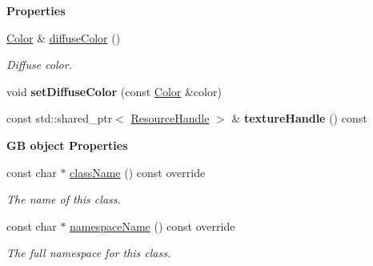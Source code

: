 \begin{Indent}\textbf{ Properties}\par
\begin{DoxyCompactItemize}
\item 
\mbox{\label{classrev_1_1_cube_map_component_a5e8163a9264a412a53f5bf65583bc320}} 
\mbox{\hyperlink{classrev_1_1_color}{Color}} \& \mbox{\hyperlink{classrev_1_1_cube_map_component_a5e8163a9264a412a53f5bf65583bc320}{diffuse\+Color}} ()
\begin{DoxyCompactList}\small\item\em Diffuse color. \end{DoxyCompactList}\item 
\mbox{\label{classrev_1_1_cube_map_component_af259a84d039ac304b7f5ed0de8df1798}} 
void {\bfseries set\+Diffuse\+Color} (const \mbox{\hyperlink{classrev_1_1_color}{Color}} \&color)
\item 
\mbox{\label{classrev_1_1_cube_map_component_a69c45ca899a3cf4497c244f60038bb1c}} 
const std\+::shared\+\_\+ptr$<$ \mbox{\hyperlink{classrev_1_1_resource_handle}{Resource\+Handle}} $>$ \& {\bfseries texture\+Handle} () const
\end{DoxyCompactItemize}
\end{Indent}
\begin{Indent}\textbf{ GB object Properties}\par
\begin{DoxyCompactItemize}
\item 
const char $\ast$ \mbox{\hyperlink{classrev_1_1_cube_map_component_a09be93995cb43696c7f7644a224b59e4}{class\+Name}} () const override
\begin{DoxyCompactList}\small\item\em The name of this class. \end{DoxyCompactList}\item 
const char $\ast$ \mbox{\hyperlink{classrev_1_1_cube_map_component_a5fd0d5b47d8ba3594d4daf0ed8135b83}{namespace\+Name}} () const override
\begin{DoxyCompactList}\small\item\em The full namespace for this class. \end{DoxyCompactList}\end{DoxyCompactItemize}
\end{Indent}
